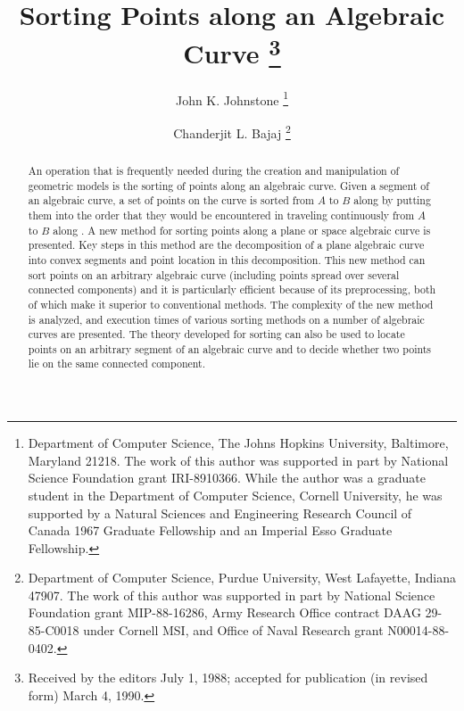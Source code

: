 \newcommand{\wwh}{\mbox{$\widehat{W_{1}W_{2}}$}}
\newcommand{\wo}{\mbox{$W_{1}$}}
\newcommand{\wt}{\mbox{$W_{2}$}}
\newcommand{\param}{{parameterization} }
\newcommand{\wallpoint}{curve point}
\newcommand{\wallpoints}{curve points}
\newcommand{\wall}{wall}
\newcommand{\walls}{walls}
\newcommand{\cellsegment}{cell segment}
\newcommand{\x}{X}
\newcommand{\y}{Y}
\newcommand{\SSo}{{\cal S}}
\newcommand{\SSt}{\mbox{S\hspace{-0.68em}S\hspace{.25em}}}  
%
\title{Sorting Points along an Algebraic Curve%
	\thanks{Received by the editors July 1, 1988;
	accepted for publication (in revised form) March 4, 1990.}}
\author{John K. Johnstone%
	\thanks{Department of Computer Science, The Johns Hopkins University, 
		Baltimore, Maryland 21218.
	The work of this author was supported in part by National Science Foundation grant 
	IRI-8910366.
	While the author was a graduate
	student in the Department of Computer Science, Cornell University, he was supported
	by a Natural Sciences and Engineering
	Research Council of Canada 1967 Graduate 
	Fellowship and an Imperial Esso Graduate Fellowship.}
\and
	Chanderjit L. Bajaj%
	\thanks{Department of Computer Science, Purdue University, 
		West Lafayette, Indiana  47907.
	The work of this author was supported in part by National Science Foundation grant
	MIP-88-16286, 
	Army Research Office contract DAAG 29-85-C0018 under Cornell MSI, and
	Office of Naval Research grant N00014-88-0402.}}

\maketitle

\begin{abstract}
An operation that is frequently needed during the creation and manipulation 
of geometric 
models is the sorting of points along an algebraic curve.
Given a segment  of an algebraic curve, a set of points on the curve 
is sorted
from $A$ to $B$ along  by putting them into the order that they 
would be encountered 
in traveling continuously from $A$ to $B$ along .
A new method for sorting points along a plane or space algebraic curve 
is presented.
Key steps in this method are the decomposition of a plane algebraic curve 
into convex 
segments and point location in this decomposition.
This new method can sort points on an arbitrary algebraic curve 
(including points spread over several connected components)
and it is particularly efficient 
because of its preprocessing, both of which make it superior to conventional 
methods.
The complexity of the new method is analyzed, and execution times of various 
sorting
methods on a number of algebraic curves are presented.
The theory developed for sorting can also be used to locate points on an 
arbitrary 
segment of an algebraic curve and to decide whether two points lie on the same 
connected 
component.
\end{abstract}

